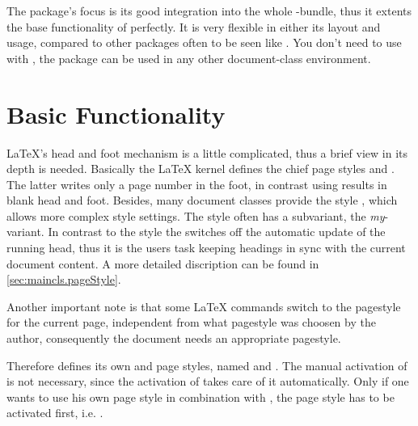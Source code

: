 \begin{Explain}
  The package's focus is its good integration into the whole
  \KOMAScript{}-bundle, thus it extents the base functionality of
  \KOMAScript{} perfectly.  It is very flexible in either its layout and
  usage, compared to other packages often to be seen like
  \cite{package:fancyhdr}.  You don't need to use
   with \KOMAScript{}, the package can be used in any other
  document-class environment.
\end{Explain}


\section{Basic Functionality}\label{sec:scrpage.basics}

\begin{Explain}%
  \LaTeX{}'s head and foot mechanism is a little complicated, thus a
  brief view in its depth is needed.
  Basically the \LaTeX{} kernel defines the chief page styles
   and .
  The latter writes only a page number in the foot, in contrast
  using  results in blank head and foot.
  Besides, many document classes provide the style
  , which allows more complex style settings.
  The  style often has a subvariant, the
  \emph{my}-variant. In contrast to the  style
  the  switches off the automatic update
  of the running head, thus it is the users task keeping headings
  in sync with the current document content.
  A more detailed discription can be found in
  \autoref{sec:maincls.pageStyle}.
  
  Another important note is that some \LaTeX{} commands
  switch to the pagestyle  for the current page,
  independent from what pagestyle was choosen by the author,
  consequently the document needs an appropriate 
   pagestyle.
  
  Therefore  defines its own 
  and  page styles, named 
  and .
  The manual activation of  is not necessary,
  since the activation of  takes care of it
  automatically.
  Only if one wants to use his own page style in combination
  with , the page style  has to
  be activated first, i.e. %
  .
\end{Explain}
  
